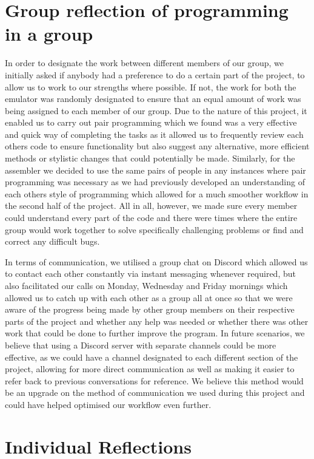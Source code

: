 \documentclass[11pt]{article}
\begin{document}
\section{Group reflection of programming in a group}
In order to designate the work between different members of our group, we initially asked if anybody had a preference to do a certain part of the project, to allow us to work to our strengths where possible. If not, the work for both the emulator was randomly designated to ensure that an equal amount of work was being assigned to each member of our group. Due to the nature of this project, it enabled us to carry out pair programming which we found was a very effective and quick way of completing the tasks as it allowed us to frequently review each others code to ensure functionality but also suggest any alternative, more efficient methods or stylistic changes that could potentially be made. Similarly, for the assembler we decided to use the same pairs of people in any instances where pair programming was necessary as we had previously developed an understanding of each others style of programming which allowed for a much smoother workflow in the second half of the project. All in all, however, we made sure every member could understand every part of the code and there were times where the entire group would work together to solve specifically challenging problems or find and correct any difficult bugs. 
\par
In terms of communication, we utilised a group chat on Discord which allowed us to contact each other constantly via instant messaging whenever required, but also facilitated our calls on Monday, Wednesday and Friday mornings which allowed us to catch up with each other as a group all at once so that we were aware of the progress being made by other group members on their respective parts of the project and whether any help was needed or whether there was other work that could be done to further improve the program. In future scenarios, we believe that using a Discord server with separate channels could be more effective, as we could have a channel designated to each different section of the project, allowing for more direct communication as well as making it easier to refer back to previous conversations for reference. We believe this method would be an upgrade on the method of communication we used during this project and could have helped optimised our workflow even further.

\section{Individual Reflections}
\end{document}
